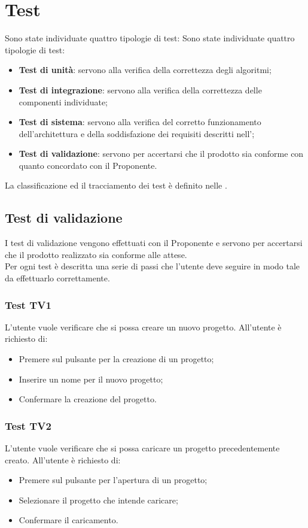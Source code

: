 \documentclass[../PianoDiQualifica.tex]{subfiles}
\begin{document}
 
	\section{Test}\label{Test} 
	Sono state individuate quattro tipologie di test: 
	Sono state individuate quattro tipologie di test: 
	\begin{itemize} 
		\item \textbf{Test di unità}: servono alla verifica della correttezza degli algoritmi; 
		\item \textbf{Test di integrazione}: servono alla verifica della correttezza delle 
		componenti individuate; 
		\item \textbf{Test di sistema}: servono alla verifica del corretto funzionamento 
		dell'architettura e della soddisfazione dei requisiti descritti nell'\analisideirequisiti; 
		\item \textbf{Test di validazione}: servono per accertarsi che il prodotto sia conforme 
		con quanto concordato con il Proponente. 
	\end{itemize} 
	La classificazione ed il tracciamento dei test è definito nelle \normediprogettov. 
	\subsection{Test di validazione} 
	I test di validazione vengono effettuati con il Proponente e servono per accertarsi che il prodotto realizzato sia conforme alle attese. \\ 
	Per ogni test è descritta 
	una serie di passi che l'utente deve seguire in modo tale da effettuarlo correttamente.  
	
	
	
	
	\subsubsection{Test TV1}  
	L'utente vuole verificare che si possa creare un nuovo progetto. 
	All'utente è richiesto di: 
	\begin{itemize} 
		\item Premere sul pulsante per la creazione di un progetto; 
		\item Inserire un nome per il nuovo progetto; 
		\item Confermare la creazione del progetto.
	\end{itemize} 
	
	\subsubsection{Test TV2} 
	L'utente vuole verificare che si possa caricare un progetto precedentemente creato. 
	All'utente è richiesto di: 
	\begin{itemize} 
		\item Premere sul pulsante per l'apertura di un progetto; 
		\item Selezionare il progetto che intende caricare; 
		\item Confermare il caricamento. 
	\end{itemize}     
	
\end{document}
